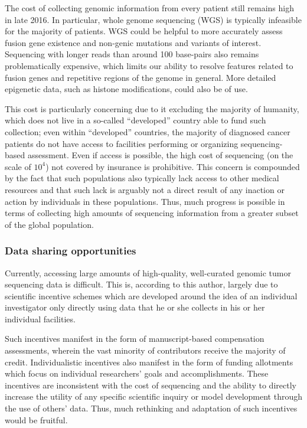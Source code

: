 The cost of collecting genomic information from every patient still remains high in late 2016. In particular, whole genome sequencing (WGS) is typically infeasible for the majority of patients. WGS could be helpful to more accurately assess fusion gene existence and non-genic mutations and variants of interest. Sequencing with longer reads than around 100 base-pairs also remains problematically expensive, which limits our ability to resolve features related to fusion genes and repetitive regions of the genome in general. More detailed epigenetic data, such as histone modifications, could also be of use. 

This cost is particularly concerning due to it excluding the majority of humanity, which does not live in a so-called ``developed'' country able to fund such collection\cite{_97_2015}; even within ``developed'' countries, the majority of diagnosed cancer patients do not have access to facilities performing or organizing sequencing-based assessment. Even if access is possible, the high cost of sequencing (on the scale of $10^4$) not covered by insurance is prohibitive\cite{regalado_why_2016}. This concern is compounded by the fact that such populations also typically lack access to other medical resources and that such lack is arguably not a direct result of any inaction or action by individuals in these populations. Thus, much progress is possible in terms of collecting high amounts of sequencing information from a greater subset of the global population. 

\subsubsection{Data sharing opportunities}

Currently, accessing large amounts of high-quality, well-curated genomic tumor sequencing data is difficult. This is, according to this author, largely due to scientific incentive schemes which are developed around the idea of an individual investigator only directly using data that he or she collects in his or her individual facilities.

Such incentives manifest in the form of manuscript-based compensation assessments, wherein the vast minority of contributors receive the majority of credit. Individualistic incentives also manifest in the form of funding allotments which focus on individual researchers' goals and accomplishments. These incentives are inconsistent with the cost of sequencing and the ability to directly increase the utility of any specific scientific inquiry or model development through the use of others' data. Thus, much rethinking and adaptation of such incentives would be fruitful. 

